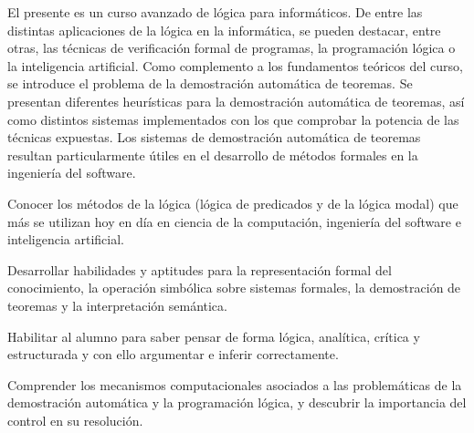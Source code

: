 \begin{syllabus}


\begin{justification}
El presente es un curso avanzado de lógica para informáticos. De
entre las distintas aplicaciones de la lógica en la informática, se
pueden destacar, entre otras, las técnicas de verificación formal de
programas, la programación lógica o la inteligencia artificial. Como
complemento a los fundamentos teóricos del curso, se introduce el
problema de la demostración automática de teoremas. Se presentan
diferentes heurísticas para la demostración automática de teoremas,
así como distintos sistemas implementados con los que comprobar la
potencia de las técnicas expuestas. Los sistemas de demostración
automática de teoremas resultan particularmente útiles en el
desarrollo de métodos formales en la ingeniería del software.
\end{justification}

\begin{goals}
\item Conocer los métodos de la lógica (lógica de predicados y de la lógica modal) que más se utilizan hoy en día en ciencia de la computación, ingeniería del software e inteligencia artificial. 
\item Desarrollar habilidades y aptitudes para la representación formal del conocimiento, la operación simbólica sobre sistemas formales, la demostración de teoremas y la interpretación semántica.
\item Habilitar al alumno para saber pensar de forma lógica, analítica, crítica y estructurada y con ello argumentar e inferir correctamente.
\item Comprender los mecanismos computacionales asociados a las problemáticas de la demostración automática y la programación lógica, y descubrir la importancia del control en su resolución.
\end{goals}

\begin{outcomes}
\end{outcomes}


\end{syllabus}
